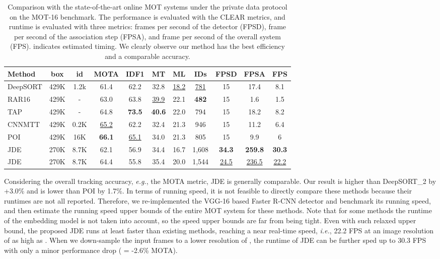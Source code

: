 \documentclass[runningheads]{llncs}
\def\ie{\textit{i.e.}}
\begin{document}
\begin{table}[t]
\centering
    \begin{tabular}{l|cc|cccccccc}
    
    \toprule
         Method & box & id &MOTA &IDF1	&MT &ML  &IDs  &FPSD &	FPSA &FPS  \\
         
    \midrule
         DeepSORT &	429K&	1.2k& 61.4&	62.2&	32.8&	\underline{18.2}&	\underline{781}&15	&17.4&	8.1 \\
         RAR16&429K&	-&	63.0&	63.8&	\underline{39.9}&	22.1&	\textbf{482}	&15&	1.6	&1.5 \\
         TAP&429K&	- &	64.8&	\textbf{73.5}&	\textbf{40.6}&	22.0& 	794	&15 &	18.2 &	8.2 \\
         CNNMTT	&	429K&	0.2K&	\underline{65.2}&	62.2&	32.4&	21.3&	946&	15&	11.2&	6.4 \\
         POI&	429K&	16K&	\textbf{66.1}&	\underline{65.1}&	34.0&	21.3&805&	15	&9.9&	6 \\
         
    \midrule
        JDE &	270K&	8.7K& 62.1&	56.9&	34.4&	16.7&1,608	&\textbf{34.3}&	\textbf{259.8}&	\textbf{30.3}	 \\
        JDE&	270K&	8.7K& 64.4&	55.8&	35.4&	20.0&1,544	&\underline{24.5}&	\underline{236.5}&	\underline{22.2}	 \\
    \bottomrule
    \end{tabular}
    \caption{Comparison with the state-of-the-art online MOT systems under the private data protocol on the MOT-16 benchmark. The performance is evaluated with the CLEAR metrics, and runtime is evaluated with three metrics: frames per second of the detector (FPSD), frame per second of the association step (FPSA), and frame per second of the overall system (FPS).  indicates estimated timing. We clearly observe our method has the best efficiency and a comparable accuracy.} \label{tab:sota}
    
\end{table}
Considering the overall tracking accuracy, \emph{e.g.}, the MOTA metric, JDE is generally comparable. Our result is higher than DeepSORT\_2 by +3.0\% and is lower than POI by 1.7\%. In terms of running speed, it is not feasible to directly compare these methods because their runtimes are not all reported. Therefore, we re-implemented the VGG-16 based Faster R-CNN detector and benchmark its running speed, and then estimate the running speed upper bounds of the entire MOT system for these methods. Note that for some methods the runtime of the embedding model is not taken into account, so the speed upper bounds are far from being tight. Even with such relaxed upper bound, the proposed JDE runs at least  faster than existing methods, reaching a near real-time speed, \ie, 22.2 FPS at an image resolution of as high as . When we down-sample the input frames to a lower resolution of , the runtime of JDE can be further sped up to 30.3 FPS with only a minor performance drop ( = -2.6\% MOTA).
\end{document}
